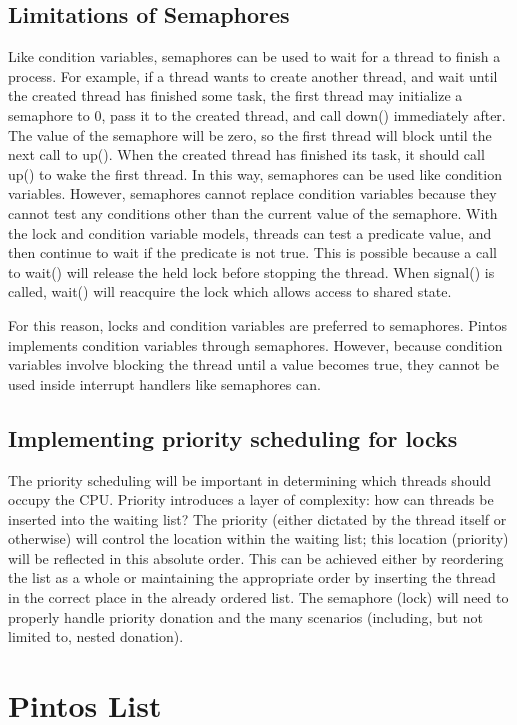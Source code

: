 \documentclass[11pt, letterpaper]{article}
\begin{document}
\subsection{Limitations of Semaphores}
Like condition variables, semaphores can be used to wait for a thread to finish a process. For example, if a thread wants to create another thread, and wait until the created thread has finished some task, the first thread may initialize a semaphore to 0, pass it to the created thread, and call down() immediately after. The value of the semaphore will be zero, so the first thread will block until the next call to up(). When the created thread has finished its task, it should call up() to wake the first thread.
In this way, semaphores can be used like condition variables. However, semaphores cannot replace condition variables because they cannot test any conditions other than the current value of the semaphore. With the lock and condition variable models, threads can test a predicate value, and then continue to wait if the predicate is not true. This is possible because a call to wait() will release the held lock before stopping the thread. When signal() is called, wait() will reacquire the lock which allows access to shared state.

For this reason, locks and condition variables are preferred to semaphores. Pintos implements condition variables through semaphores. However, because condition variables involve blocking the thread until a value becomes true, they cannot be used inside interrupt handlers like semaphores can. 

\subsection{Implementing priority scheduling for locks}
The priority scheduling will be important in determining which threads should occupy the CPU. Priority introduces a layer of complexity: how can threads be inserted into the waiting list?  The priority (either dictated by the thread itself or otherwise) will control the location within the waiting list; this location (priority) will be reflected in this absolute order. This can be achieved either by reordering the list as a whole or maintaining the appropriate order by inserting the thread in the correct place in the already ordered list. The semaphore (lock) will need to properly handle priority donation and the many scenarios (including, but not limited to, nested donation). 


\section{Pintos List}
\end{document}
